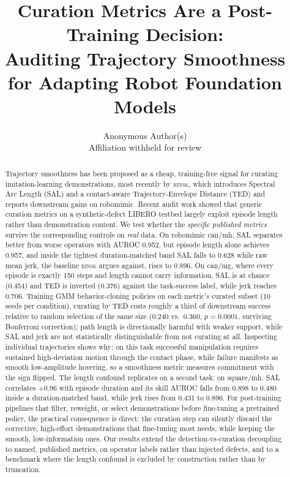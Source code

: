 \documentclass{article}
\title{Curation Metrics Are a Post-Training Decision:\\
Auditing Trajectory Smoothness for Adapting Robot Foundation Models}
\author{Anonymous Author(s)\\ \small Affiliation withheld for review}
\date{}
\newcommand{\rinse}{\textsc{rinse}}
\begin{document}
\maketitle

\begin{abstract}
Trajectory smoothness has been proposed as a cheap, training-free signal for
curating imitation-learning demonstrations, most recently by \rinse{}, which
introduces Spectral Arc Length (SAL) and a contact-aware Trajectory-Envelope
Distance (TED) and reports downstream gains on robomimic. Recent audit work
showed that generic curation metrics on a synthetic-defect LIBERO testbed
largely exploit episode length rather than demonstration content. We test
whether the \emph{specific published metrics} survive the corresponding
controls on \emph{real} data. On robomimic can/mh, SAL separates
better from worse operators with AUROC 0.952, but episode length alone
achieves 0.957, and inside the tightest duration-matched band SAL falls to
0.628 while raw mean jerk, the baseline \rinse{} argues
against, rises to 0.896. On can/mg, where every episode is exactly 150
steps and length cannot carry information, SAL is at chance (0.454) and TED
is inverted (0.376) against the task-success label, while jerk reaches
0.706. Training GMM behavior-cloning policies on each metric's curated
subset (10 seeds per condition), curating by TED costs roughly a third of
downstream success relative to random selection of the same size (0.240
vs.\ 0.360, $p{=}0.0001$, surviving Bonferroni correction); path length is
directionally harmful with weaker support, while SAL and jerk are not
statistically distinguishable from not curating at all.
Inspecting individual trajectories shows why: on this task successful
manipulation requires sustained high-deviation motion through the contact
phase, while failure manifests as smooth low-amplitude hovering, so a
smoothness metric measures commitment with the sign flipped. The length
confound replicates on a second task: on square/mh, SAL correlates $+0.96$
with episode duration and its skill AUROC falls from 0.898 to 0.480 inside a
duration-matched band, while jerk rises from 0.431 to 0.896. For
post-training pipelines that filter, reweight, or select demonstrations
before fine-tuning a pretrained policy, the practical consequence is direct:
the curation step can silently discard the corrective, high-effort
demonstrations that fine-tuning most needs, while keeping the smooth,
low-information ones. Our results extend the detection-vs-curation
decoupling to named, published metrics, on operator labels rather than
injected defects, and to a benchmark where the length confound is excluded
by construction rather than by truncation.
\end{abstract}
\end{document}

